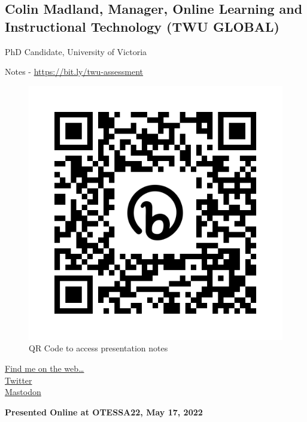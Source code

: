 \documentclass[
]{book}
\begin{document}
\hypertarget{colin-madland-manager-online-learning-and-instructional-technology-twu-global}{%
\subsection*{Colin Madland, Manager, Online Learning and Instructional Technology (TWU GLOBAL)}\label{colin-madland-manager-online-learning-and-instructional-technology-twu-global}}

PhD Candidate, University of Victoria

Notes - \url{https://bit.ly/twu-assessment}

\begin{figure}
\centering
\includegraphics{assets/twu-asmt/twu-asmt.png}
\caption{QR Code to access presentation notes}
\end{figure}

\href{https://cmad.land}{Find me on the web\ldots{}}\\
\href{https://twitter.com/colinmadland}{Twitter}\\
\href{https://scholar.social/web/@Cmadland}{Mastodon}

\textbf{Presented Online at OTESSA22, May 17, 2022}
\end{document}
